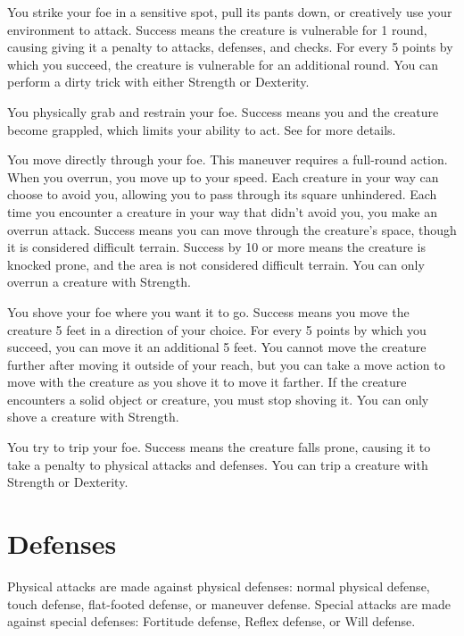 \label{Dirty Trick} You strike your foe in a sensitive spot, pull its pants down, or creatively use your environment to attack. Success means the creature is vulnerable for 1 round, causing giving it a  penalty to attacks, defenses, and checks. For every 5 points by which you succeed, the creature is vulnerable for an additional round. You can perform a dirty trick with either Strength or Dexterity.

\label{Grapple} You physically grab and restrain your foe. Success means you and the creature become grappled, which limits your ability to act. See  for more details.

\label{Overrun} You move directly through your foe. This maneuver requires a full-round action. When you overrun, you move up to your speed. Each creature in your way can choose to avoid you, allowing you to pass through its square unhindered. Each time you encounter a creature in your way that didn't avoid you, you make an overrun attack. Success means you can move through the creature's space, though it is considered difficult terrain. Success by 10 or more means the creature is knocked prone, and the area is not considered difficult terrain. You can only overrun a creature with Strength.

\label{Shove} You shove your foe where you want it to go. Success means you move the creature 5 feet in a direction of your choice. For every 5 points by which you succeed, you can move it an additional 5 feet. You cannot move the creature further after moving it outside of your reach, but you can take a move action to move with the creature as you shove it to move it farther. If the creature encounters a solid object or creature, you must stop shoving it. You can only shove a creature with Strength.

\label{Trip} You try to trip your foe. Success means the creature falls prone, causing it to take a  penalty to physical attacks and defenses. You can trip a creature with Strength or Dexterity.

\section{Defenses}\label{Defenses}
Physical attacks are made against physical defenses: normal physical defense, touch defense, flat-footed defense, or maneuver defense. Special attacks are made against special defenses: Fortitude defense, Reflex defense, or Will defense.


